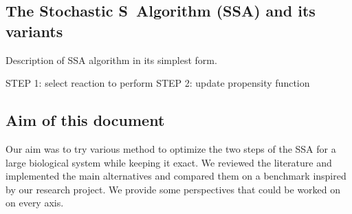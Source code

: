 \documentclass[12pt]{scrartcl}
\theoremstyle{definition}
\theoremstyle{remark}
\numberwithin{equation}{section}
\begin{document}
\subsection{The Stochastic S Algorithm (SSA) and its variants}

Description of SSA algorithm in its simplest form.

STEP 1: select reaction to perform
STEP 2: update propensity function

\subsection{Aim of this document}

Our aim was to try various method to optimize the two steps of the SSA for a large biological system while keeping it exact. We reviewed the literature and implemented the main alternatives and compared them on a benchmark inspired by our research project. We provide some perspectives that could be worked on on every axis.






\appendix




\end{document}
